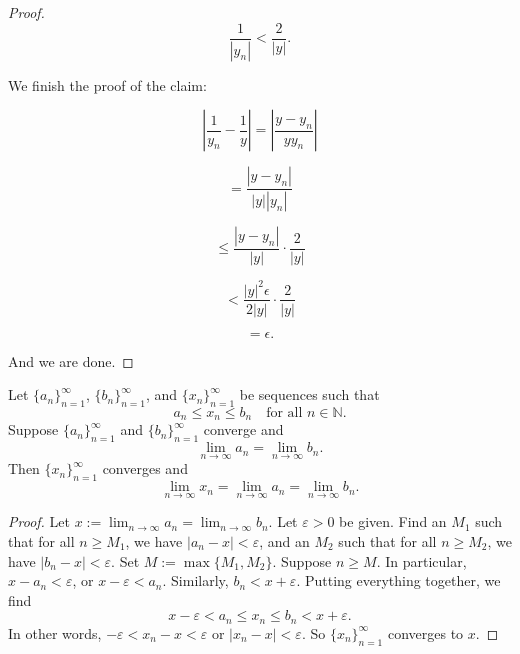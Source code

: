 \documentclass[../main.tex]{subfiles}
\begin{document}
\begin{proof}
\[
\frac{1}{|y_n|} < \frac{2}{|y|}.
\]

We finish the proof of the claim:

\[
\left| \frac{1}{y_n} - \frac{1}{y} \right| = \left| \frac{y - y_n}{y y_n} \right|
\]

\[
= \frac{|y - y_n|}{|y| |y_n|}
\]

\[
\leq \frac{|y - y_n|}{|y|} \cdot \frac{2}{|y|}
\]

\[
< \frac{|y|^2 \epsilon}{2|y|} \cdot \frac{2}{|y|}
\]

\[
= \epsilon.
\]

And we are done.
    \end{proof}
    
    
    
    
    
    
    
    
    
    
    
    
    
    
    
    
    
    
    
    
    \begin{lemma} \label{lem:squeeze}
    Let \( \{a_n\}_{n=1}^{\infty} \), \( \{b_n\}_{n=1}^{\infty} \), and \( \{x_n\}_{n=1}^{\infty} \) be sequences such that
    \[
    a_n \leq x_n \leq b_n \quad \text{for all } n \in \mathbb{N}.
    \]
    Suppose \( \{a_n\}_{n=1}^{\infty} \) and \( \{b_n\}_{n=1}^{\infty} \) converge and
    \[
    \lim_{n\to\infty} a_n = \lim_{n\to\infty} b_n.
    \]
    Then \( \{x_n\}_{n=1}^{\infty} \) converges and
    \[
    \lim_{n\to\infty} x_n = \lim_{n\to\infty} a_n = \lim_{n\to\infty} b_n.
    \]
    \end{lemma}
    
    
    
    
    
    
    
    
    \begin{proof}
    Let \( x := \lim_{n\to\infty} a_n = \lim_{n\to\infty} b_n \). Let \( \varepsilon > 0 \) be given. Find an \( M_1 \) such that for all \( n \geq M_1 \), we have \( |a_n - x| < \varepsilon \), and an \( M_2 \) such that for all \( n \geq M_2 \), we have \( |b_n - x| < \varepsilon \). Set \( M := \max\{M_1, M_2\} \). Suppose \( n \geq M \). In particular, \( x - a_n < \varepsilon \), or \( x - \varepsilon < a_n \). Similarly, \( b_n < x + \varepsilon \). Putting everything together, we find
    \[
    x - \varepsilon < a_n \leq x_n \leq b_n < x + \varepsilon.
    \]
    In other words, \( -\varepsilon < x_n - x < \varepsilon \) or \( |x_n - x| < \varepsilon \). So \( \{x_n\}_{n=1}^{\infty} \) converges to \( x \).   
    \end{proof}
    
\end{document}
